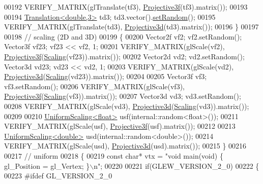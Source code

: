 \begin{DoxyCode}
00192     VERIFY\_MATRIX(glTranslate(tf3), \hyperlink{group___geometry___module_gab14804071b7486b6666f3d324475a478}{Projective3f}(tf3).matrix());
00193     
00194     \hyperlink{group___geometry___module_class_eigen_1_1_translation}{Translation<double,3>} td3;  td3.vector().\hyperlink{class_eigen_1_1_plain_object_base_af0e576a0e1aefc9ee346de44cc352ba3}{setRandom}();
00195     VERIFY\_MATRIX(glTranslate(td3), \hyperlink{group___geometry___module_gab9cec8c457da930391eb73370e07aaae}{Projective3d}(td3).matrix());
00196   \}
00197   
00198   \textcolor{comment}{// scaling (2D and 3D)}
00199   \{
00200     Vector2f vf2; vf2.setRandom(); Vector3f vf23; vf23 << vf2, 1;
00201     VERIFY\_MATRIX(glScale(vf2), \hyperlink{group___geometry___module_gab14804071b7486b6666f3d324475a478}{Projective3f}(\hyperlink{group___geometry___module_ga23a8ed57e3f2973526026765ae697761}{Scaling}(vf23)).matrix());
00202     Vector2d vd2; vd2.setRandom(); Vector3d vd23; vd23 << vd2, 1;
00203     VERIFY\_MATRIX(glScale(vd2), \hyperlink{group___geometry___module_gab9cec8c457da930391eb73370e07aaae}{Projective3d}(\hyperlink{group___geometry___module_ga23a8ed57e3f2973526026765ae697761}{Scaling}(vd23)).matrix());
00204     
00205     Vector3f vf3; vf3.setRandom();
00206     VERIFY\_MATRIX(glScale(vf3), \hyperlink{group___geometry___module_gab14804071b7486b6666f3d324475a478}{Projective3f}(\hyperlink{group___geometry___module_ga23a8ed57e3f2973526026765ae697761}{Scaling}(vf3)).matrix());
00207     Vector3d vd3; vd3.setRandom();
00208     VERIFY\_MATRIX(glScale(vd3), \hyperlink{group___geometry___module_gab9cec8c457da930391eb73370e07aaae}{Projective3d}(\hyperlink{group___geometry___module_ga23a8ed57e3f2973526026765ae697761}{Scaling}(vd3)).matrix());
00209     
00210     \hyperlink{class_eigen_1_1_uniform_scaling}{UniformScaling<float>} usf(internal::random<float>());
00211     VERIFY\_MATRIX(glScale(usf), \hyperlink{group___geometry___module_gab14804071b7486b6666f3d324475a478}{Projective3f}(usf).matrix());
00212     
00213     \hyperlink{class_eigen_1_1_uniform_scaling}{UniformScaling<double>} usd(internal::random<double>());
00214     VERIFY\_MATRIX(glScale(usd), \hyperlink{group___geometry___module_gab9cec8c457da930391eb73370e07aaae}{Projective3d}(usd).matrix());
00215   \}
00216   
00217   \textcolor{comment}{// uniform}
00218   \{
00219     \textcolor{keyword}{const} \textcolor{keywordtype}{char}* vtx = \textcolor{stringliteral}{"void main(void) \{ gl\_Position = gl\_Vertex; \}\(\backslash\)n"};
00220     
00221     \textcolor{keywordflow}{if}(GLEW\_VERSION\_2\_0)
00222     \{
00223 \textcolor{preprocessor}{      #ifdef GL\_VERSION\_2\_0}

\end{DoxyCode}

